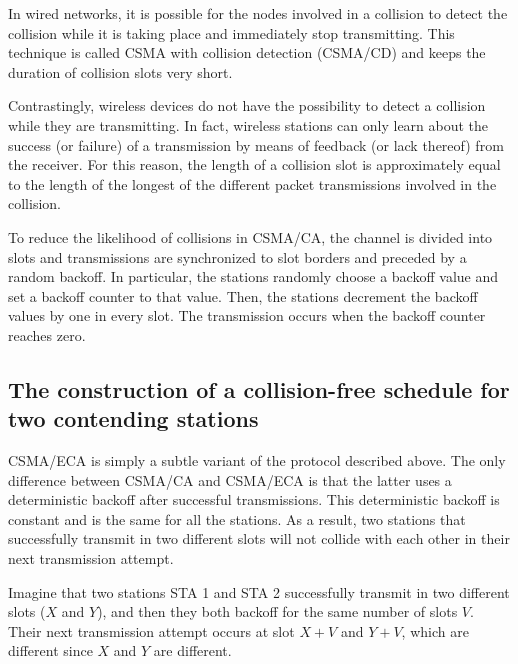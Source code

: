 \documentclass[journal]{IEEEtran}
\begin{document}
In wired networks, it is possible for the nodes involved in a collision to detect the collision while it is taking place and immediately stop transmitting.
This technique is called CSMA with collision detection (CSMA/CD) and keeps the duration of collision slots very short.

Contrastingly, wireless devices do not have the possibility to detect a collision while they are transmitting.
In fact, wireless stations can only learn about the success (or failure) of a transmission by means of feedback (or lack thereof) from the receiver.
For this reason, the length of a collision slot is approximately equal to the length of the longest of the different packet transmissions involved in the collision.

To reduce the likelihood of collisions in CSMA/CA, the channel is divided into slots and transmissions are synchronized to slot borders and preceded by a random backoff.
In particular, the stations randomly choose a backoff value and set a backoff counter to that value.
Then, the stations decrement the backoff values by one in every slot.
The transmission occurs when the backoff counter reaches zero.

\subsection{The construction of a collision-free schedule for two contending stations}
CSMA/ECA is simply a subtle variant of the protocol described above.
The only difference between CSMA/CA and CSMA/ECA is that the latter uses a deterministic backoff after successful transmissions.
This deterministic backoff is constant and is the same for all the stations.
As a result, two stations that successfully transmit in two different slots will not collide with each other in their next transmission attempt.

Imagine that two stations STA 1 and STA 2 successfully transmit in two different slots ($X$ and $Y$),  and then they both backoff for the same number of slots $V$.
Their next transmission attempt occurs at slot $X+V$ and $Y+V$, which are different since $X$ and $Y$ are different.
\end{document}
